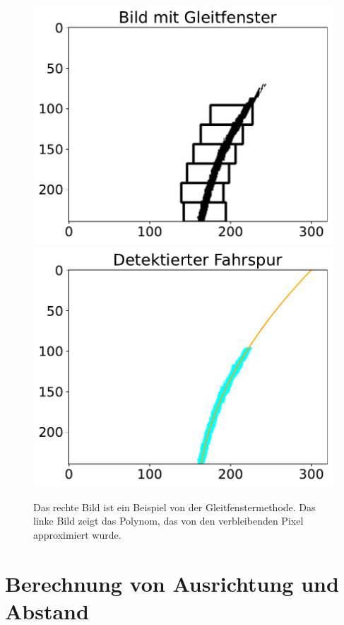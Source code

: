 \documentclass[arbeit=studie,oneside,BCOR=12mm]{ArbeitRST}
\begin{document}
\begin{figure}[h]
    \centering
    \includegraphics[scale=0.47]{before_filter}
    \includegraphics[scale=0.47]{after_filter}
    \caption{Das rechte Bild ist ein Beispiel von der Gleitfenstermethode. Das linke Bild
    zeigt das Polynom, das von den verbleibenden Pixel approximiert wurde.}
    \label{gleit}
\end{figure}

\section{Berechnung von Ausrichtung und Abstand}
\end{document}

